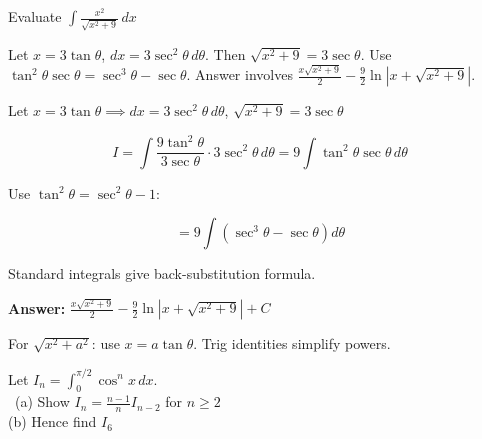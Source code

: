 
\begin{problem}
Evaluate $\displaystyle \int \frac{x^2}{\sqrt{x^2 + 9}} \, dx$
\end{problem}

\begin{hint}
Let $x = 3\tan\theta$, $dx = 3\sec^2\theta \, d\theta$. Then $\sqrt{x^2+9} = 3\sec\theta$. Use $\tan^2\theta\sec\theta = \sec^3\theta - \sec\theta$. Answer involves $\frac{x\sqrt{x^2+9}}{2} - \frac{9}{2}\ln|x + \sqrt{x^2+9}|$.
\end{hint}

\begin{solution}
Let $x=3\tan\theta \implies dx=3\sec^2\theta\,d\theta$, $\sqrt{x^2+9}=3\sec\theta$

\[
I = \int\frac{9\tan^2\theta}{3\sec\theta} \cdot 3\sec^2\theta\,d\theta = 9\int\tan^2\theta\sec\theta\,d\theta
\]

Use $\tan^2\theta = \sec^2\theta - 1$:

\[
= 9\int(\sec^3\theta - \sec\theta)d\theta
\]

Standard integrals give back-substitution formula.

\textbf{Answer:} $\boxed{\frac{x\sqrt{x^2+9}}{2} - \frac{9}{2}\ln|x+\sqrt{x^2+9}| + C}$
\end{solution}

\begin{takeaways}
For $\sqrt{x^2+a^2}$: use $x=a\tan\theta$. Trig identities simplify powers.
\end{takeaways}

\vspace{1cm}

\begin{problem}
Let $I_n = \displaystyle \int_0^{\pi/2} \cos^n x \, dx$.\\\  
(a) Show $I_n = \frac{n-1}{n}I_{n-2}$ for $n \geq 2$\\
(b) Hence find $I_6$
\end{problem}

